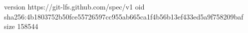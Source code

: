 version https://git-lfs.github.com/spec/v1
oid sha256:4b1803752b50fce55726597cc955ab665ca1f4b56b13ef433ed5a9f758209baf
size 158544
